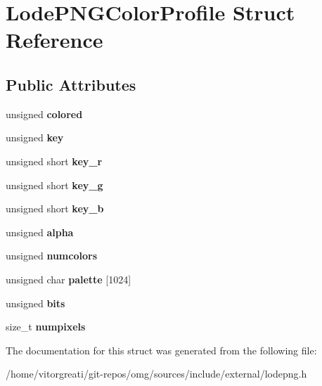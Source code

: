 \hypertarget{struct_lode_p_n_g_color_profile}{}\section{Lode\+P\+N\+G\+Color\+Profile Struct Reference}
\label{struct_lode_p_n_g_color_profile}
\subsection*{Public Attributes}
\begin{DoxyCompactItemize}
\item 
\mbox{\label{struct_lode_p_n_g_color_profile_abf063a566a4ab9f4d71b49764573d610}} 
unsigned {\bfseries colored}
\item 
\mbox{\label{struct_lode_p_n_g_color_profile_a24f19f400a53672340877eefbc837b0c}} 
unsigned {\bfseries key}
\item 
\mbox{\label{struct_lode_p_n_g_color_profile_a0398985ae0572ef97e83c33c7486cafd}} 
unsigned short {\bfseries key\+\_\+r}
\item 
\mbox{\label{struct_lode_p_n_g_color_profile_aba03e973374bd15315b8c01b86e94e8f}} 
unsigned short {\bfseries key\+\_\+g}
\item 
\mbox{\label{struct_lode_p_n_g_color_profile_a39b65ec69f6aaee3ee7312a993f21e40}} 
unsigned short {\bfseries key\+\_\+b}
\item 
\mbox{\label{struct_lode_p_n_g_color_profile_a554fea329af8034e91e1cdd8c1af0d90}} 
unsigned {\bfseries alpha}
\item 
\mbox{\label{struct_lode_p_n_g_color_profile_afdce0f5fbec46d6b8f1ec63da0a285f9}} 
unsigned {\bfseries numcolors}
\item 
\mbox{\label{struct_lode_p_n_g_color_profile_a223f8bee4c9ae8be0b70cc08f19aaead}} 
unsigned char {\bfseries palette} \mbox{[}1024\mbox{]}
\item 
\mbox{\label{struct_lode_p_n_g_color_profile_a1d3870b03dfe6d699bf4c968c9bc1890}} 
unsigned {\bfseries bits}
\item 
\mbox{\label{struct_lode_p_n_g_color_profile_a12de3184a6f953e34e2b8551b806f556}} 
size\+\_\+t {\bfseries numpixels}
\end{DoxyCompactItemize}


The documentation for this struct was generated from the following file\+:\begin{DoxyCompactItemize}
\item 
/home/vitorgreati/git-\/repos/omg/sources/include/external/lodepng.\+h\end{DoxyCompactItemize}
